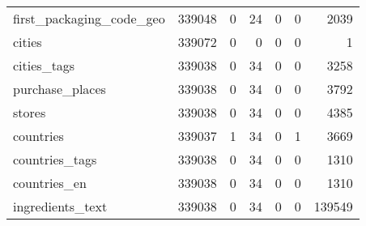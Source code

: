 \begin{tabular}{lrrrrrr}
first\_packaging\_code\_geo                   &                                        339048 &                                         0 &                                            24 &                                         0 &                      0 &             2039 \\
cities                                     &                                        339072 &                                         0 &                                             0 &                                         0 &                      0 &                1 \\
cities\_tags                                &                                        339038 &                                         0 &                                            34 &                                         0 &                      0 &             3258 \\
purchase\_places                            &                                        339038 &                                         0 &                                            34 &                                         0 &                      0 &             3792 \\
stores                                     &                                        339038 &                                         0 &                                            34 &                                         0 &                      0 &             4385 \\
countries                                  &                                        339037 &                                         1 &                                            34 &                                         0 &                      1 &             3669 \\
countries\_tags                             &                                        339038 &                                         0 &                                            34 &                                         0 &                      0 &             1310 \\
countries\_en                               &                                        339038 &                                         0 &                                            34 &                                         0 &                      0 &             1310 \\
ingredients\_text                           &                                        339038 &                                         0 &                                            34 &                                         0 &                      0 &           139549 \\

\end{tabular}
